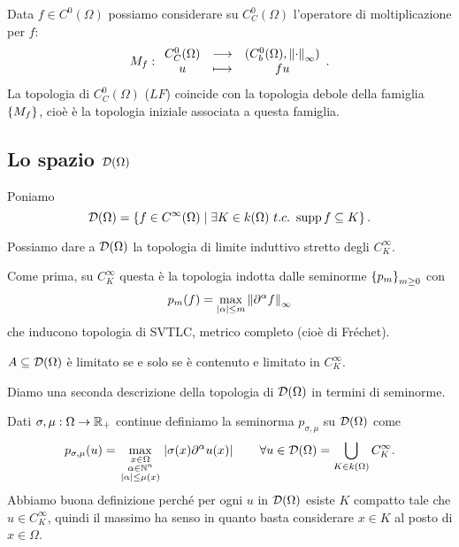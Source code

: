 \begin{remark}
Data $f\in C^0(\Omega)$ possiamo considerare su $C^0_C(\Omega)$ l'operatore di moltiplicazione per $f$:
\[M_f:\begin{array}{ccc} {C^0_C(\Omega)} & \longrightarrow & {(C^0_b(\Omega),{\left\Vert{\cdot}\right\Vert}_\infty)}\\ {u} & \longmapsto & {fu} \end{array}.\]
La topologia di $C^0_C(\Omega)$ ($LF$) coincide con la topologia debole della famiglia $\left\{{M_f}\right\}$, cio\`e \`e la topologia iniziale associata a questa famiglia.
\end{remark}




\subsection{Lo spazio \texorpdfstring{$\mathcal{D}(\Omega)$}{DOmega}}
\begin{definition}
Poniamo
\[\mathcal{D}(\Omega)=\left\{{f\in C^\infty(\Omega)\mid \exists K\in k(\Omega)\ t.c.\ \operatorname{supp} f\subseteq K}\right\}.\]
\end{definition}
\begin{remark}
Possiamo dare a $\mathcal{D}(\Omega)$ la topologia di limite induttivo stretto degli $C^\infty_K$.
\end{remark}

\begin{remark}
Come prima, su $C^\infty_K$ questa \`e la topologia indotta dalle seminorme $\left\{{p_m}\right\}_{m\geq0}$ con
\[p_m(f)=\max_{\left|{\alpha}\right|\leq m}\left\Vert{\partial^\alpha f}\right\Vert_{\infty}\]
che inducono topologia di SVTLC, metrico completo (cio\`e di Fr\'echet).
\end{remark}

\begin{remark}
$A\subseteq \mathcal{D}(\Omega)$ \`e limitato se e solo se \`e contenuto e limitato in $C^\infty_K$.
\end{remark}


Diamo una seconda descrizione della topologia di $\mathcal{D}(\Omega)$ in termini di seminorme.
\begin{definition}
Dati $\sigma,\mu:\Omega\to \mathbb{R}_+$ continue definiamo la seminorma $p_{\sigma,\mu}$ su $\mathcal{D}(\Omega)$ come
\[p_{\sigma,\mu}(u)=\max_{\begin{smallmatrix}x\in\Omega\\\alpha\in\mathbb{N}^n\\\left|{\alpha}\right|\leq \mu(x)\end{smallmatrix}}\left|{\sigma(x)\partial^\alpha u(x)}\right|\qquad \forall u\in \mathcal{D}(\Omega)=\bigcup_{K\in k(\Omega)}C^\infty_K.\]
Abbiamo buona definizione perch\'e per ogni $u$ in $\mathcal{D}(\Omega)$ esiste $K$ compatto tale che $u\in C^\infty_K$, quindi il massimo ha senso in quanto basta considerare $x\in K$ al posto di $x\in \Omega$.
\end{definition}

